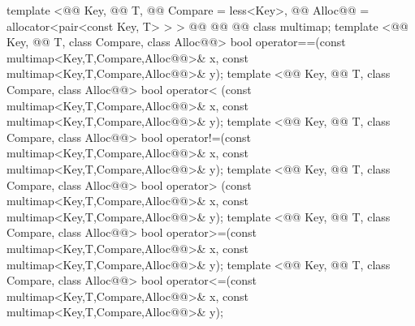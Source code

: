 \documentclass[american,twoside]{book}
\begin{document}
\begin{codeblock}
{  template <@@ Key, @@ T, 
            @@ Compare = less<Key>,
            @@ Alloc@@ = allocator<pair<const Key, T> > >
    @@
             @@
             @@
    class multimap;
  template <@@ Key, @@ T, class Compare, class Alloc@@>
    bool operator==(const multimap<Key,T,Compare,Alloc@@>& x,
                    const multimap<Key,T,Compare,Alloc@@>& y);
  template <@@ Key, @@ T, class Compare, class Alloc@@>
    bool operator< (const multimap<Key,T,Compare,Alloc@@>& x,
                    const multimap<Key,T,Compare,Alloc@@>& y);
  template <@@ Key, @@ T, class Compare, class Alloc@@>
    bool operator!=(const multimap<Key,T,Compare,Alloc@@>& x,
                    const multimap<Key,T,Compare,Alloc@@>& y);
  template <@@ Key, @@ T, class Compare, class Alloc@@>
    bool operator> (const multimap<Key,T,Compare,Alloc@@>& x,
                    const multimap<Key,T,Compare,Alloc@@>& y);
  template <@@ Key, @@ T, class Compare, class Alloc@@>
    bool operator>=(const multimap<Key,T,Compare,Alloc@@>& x,
                    const multimap<Key,T,Compare,Alloc@@>& y);
  template <@@ Key, @@ T, class Compare, class Alloc@@>
    bool operator<=(const multimap<Key,T,Compare,Alloc@@>& x,
                    const multimap<Key,T,Compare,Alloc@@>& y);
}
\end{codeblock}
\end{document}
